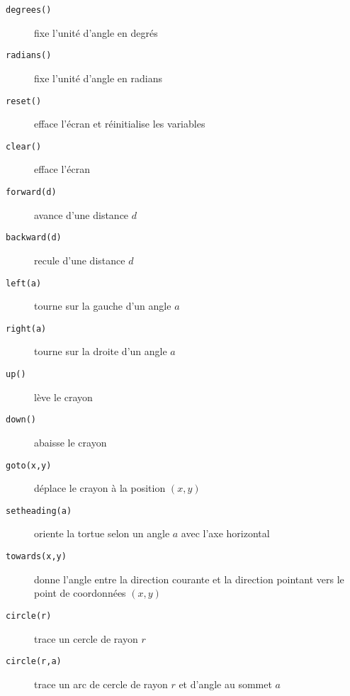 \documentclass[11pt,a4paper]{article}
\begin{document}
\begin{minipage}{14cm}\footnotesize
\begin{description}
\item[\tt degrees()] fixe l'unité d'angle en degrés
\item[\tt radians()] fixe l'unité d'angle en radians
\item[\tt reset()] efface l'écran et réinitialise les variables
\item[\tt clear()] efface l'écran
\item[\tt forward(d)] avance d'une distance $d$
\item[\tt backward(d)] recule d'une distance $d$
\item[\tt left(a)] tourne sur la gauche d'un angle $a$
\item[\tt right(a)] tourne sur la droite d'un angle $a$
\item[\tt up()] lève le crayon 
\item[\tt down()] abaisse le crayon 
\item[\tt goto(x,y)] déplace le crayon à la position $(x,y)$
\item[\tt setheading(a)] oriente la tortue selon un angle $a$ avec l'axe horizontal
\item[\tt towards(x,y)] donne l'angle entre la direction courante et la direction 
	pointant vers le point de coordonnées $(x,y)$
\item[\tt circle(r)] trace un cercle de rayon $r$
\item[\tt circle(r,a)] trace un arc de cercle de rayon $r$ et d'angle au sommet $a$
\end{description}
\end{minipage}

\label{fini}
\end{document}
